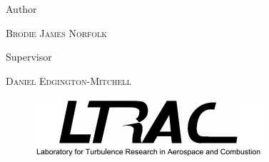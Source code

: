\begin{titlepage}
	\vspace{2\baselineskip} %
	
	

	
	\vspace*{3\baselineskip} %
	
	
	Author
	
	\vspace{0.5\baselineskip} %
	
	{\scshape\Large Brodie James Norfolk} %
	
	\vspace{2\baselineskip}
	Supervisor
	
	\vspace{0.5\baselineskip} %
	
	{\scshape\Large Daniel Edgington-Mitchell} %
	
	\vspace{2\baselineskip} %
	
	
	\vfill %
	
	\begin{figure}[H] 
	 \centering
	 \includegraphics[scale=0.6]{ltrac_logo.png} 
    \end{figure}
	
	


\end{titlepage}

